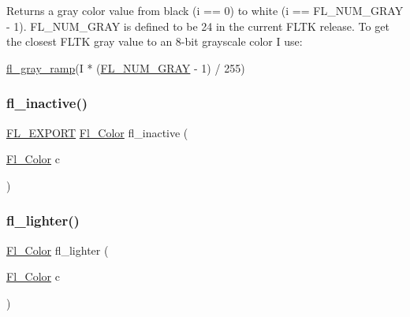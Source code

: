 Returns a gray color value from black (i == 0) to white (i == F\+L\+\_\+\+N\+U\+M\+\_\+\+G\+R\+AY -\/ 1). F\+L\+\_\+\+N\+U\+M\+\_\+\+G\+R\+AY is defined to be 24 in the current F\+L\+TK release. To get the closest F\+L\+TK gray value to an 8-\/bit grayscale color \textquotesingle{}I\textquotesingle{} use\+:


\begin{DoxyCode}
\hyperlink{_enumerations_8_h_a6045423248a367d4d3885109f18e0bd9}{fl\_gray\_ramp}(I * (\hyperlink{_enumerations_8_h_a389c78c6cb1615efe55dfc06b935ec10}{FL\_NUM\_GRAY} - 1) / 255)
\end{DoxyCode}
 \mbox{\label{_enumerations_8_h_ae8e47883ab1e3a6ee6b8ac3595e1eef3}} 
\subsubsection{\texorpdfstring{fl\+\_\+inactive()}{fl\_inactive()}}
{\footnotesize\ttfamily \hyperlink{_fl___export_8_h_aa9ba29a18aee9d738370a06eeb4470fc}{F\+L\+\_\+\+E\+X\+P\+O\+RT} \hyperlink{_enumerations_8_h_a8b762953646f8abee866061f1af78a6a}{Fl\+\_\+\+Color} fl\+\_\+inactive (\begin{DoxyParamCaption}\item[{\hyperlink{_enumerations_8_h_a8b762953646f8abee866061f1af78a6a}{Fl\+\_\+\+Color}}]{c }\end{DoxyParamCaption})}

\mbox{\label{_enumerations_8_h_affef7da8b67f0b735d5dcb9ebe60e17d}} 
\subsubsection{\texorpdfstring{fl\+\_\+lighter()}{fl\_lighter()}}
{\footnotesize\ttfamily \hyperlink{_enumerations_8_h_a8b762953646f8abee866061f1af78a6a}{Fl\+\_\+\+Color} fl\+\_\+lighter (\begin{DoxyParamCaption}\item[{\hyperlink{_enumerations_8_h_a8b762953646f8abee866061f1af78a6a}{Fl\+\_\+\+Color}}]{c }\end{DoxyParamCaption})\hspace{0.3cm}{\ttfamily [inline]}}

